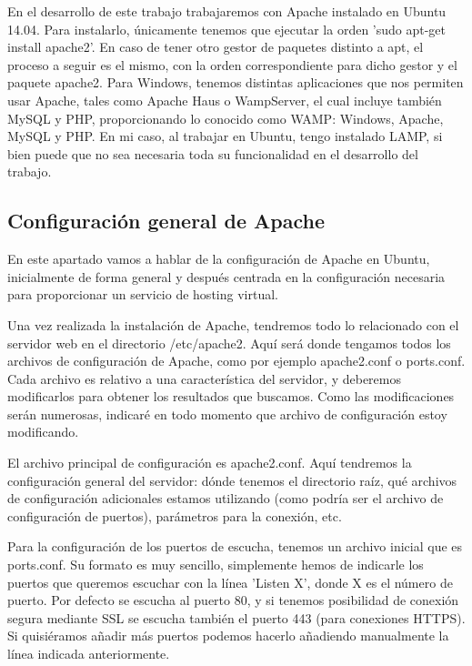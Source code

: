 \documentclass[a4paper, 10pt]{article} %
\begin{document}
En el desarrollo de este trabajo trabajaremos con Apache instalado en Ubuntu 14.04. Para instalarlo, únicamente tenemos que ejecutar la orden 'sudo apt-get install apache2'. En caso de tener otro gestor de paquetes distinto a apt, el proceso a seguir es el mismo, con la orden correspondiente para dicho gestor y el paquete apache2. Para Windows, tenemos distintas aplicaciones que nos permiten usar Apache, tales como Apache Haus o WampServer, el cual incluye también MySQL y PHP, proporcionando lo conocido como WAMP: Windows, Apache, MySQL y PHP. En mi caso, al trabajar en Ubuntu, tengo instalado LAMP, si bien puede que no sea necesaria toda su funcionalidad en el desarrollo del trabajo. 


\subsection{Configuración general de Apache}


En este apartado vamos a hablar de la configuración de Apache en Ubuntu, inicialmente de forma general y después centrada en la configuración necesaria para proporcionar un servicio de hosting virtual. 

Una vez realizada la instalación de Apache, tendremos todo lo relacionado con el servidor web en el directorio /etc/apache2. Aquí será donde tengamos todos los archivos de configuración de Apache, como por ejemplo apache2.conf o ports.conf. Cada archivo es relativo a una característica del servidor, y deberemos modificarlos para obtener los resultados que buscamos. Como las modificaciones serán numerosas, indicaré en todo momento que archivo de configuración estoy modificando. 

El archivo principal de configuración es apache2.conf. Aquí tendremos la configuración general del servidor: dónde tenemos el directorio raíz, qué archivos de configuración adicionales estamos utilizando (como podría ser el archivo de configuración de puertos), parámetros para la conexión, etc. 

Para la configuración de los puertos de escucha, tenemos un archivo inicial que es ports.conf. Su formato es muy sencillo, simplemente hemos de indicarle los puertos que queremos escuchar con la línea 'Listen X', donde X es el número de puerto. Por defecto se escucha al puerto 80, y si tenemos posibilidad de conexión segura mediante SSL se escucha también el puerto 443 (para conexiones HTTPS). Si quisiéramos añadir más puertos podemos hacerlo añadiendo manualmente la línea indicada anteriormente. 
\end{document}
